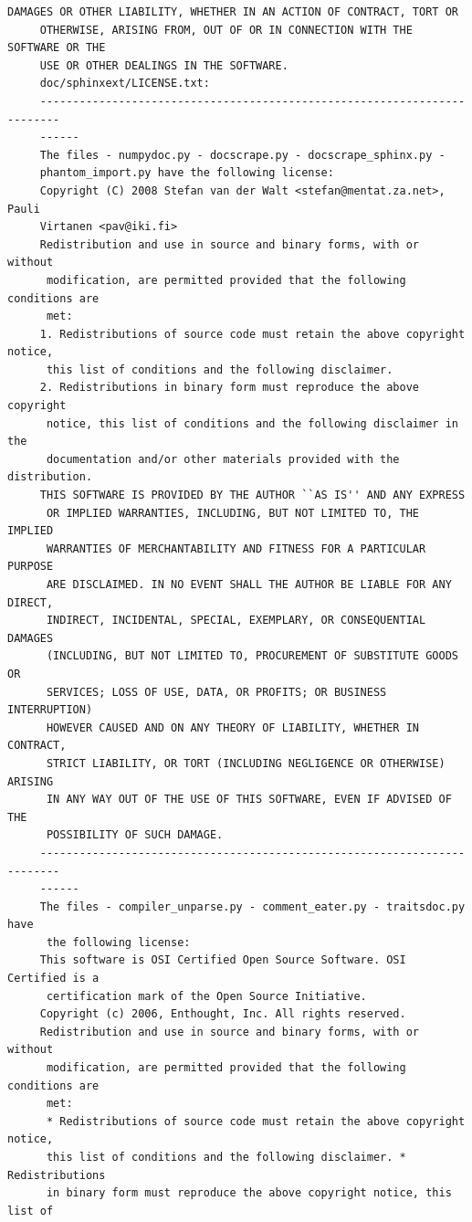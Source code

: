 \begin{lstlisting}[basicstyle=\ttfamily\footnotesize,breaklines=true]
     DAMAGES OR OTHER LIABILITY, WHETHER IN AN ACTION OF CONTRACT, TORT OR
     OTHERWISE, ARISING FROM, OUT OF OR IN CONNECTION WITH THE SOFTWARE OR THE
     USE OR OTHER DEALINGS IN THE SOFTWARE.
     doc/sphinxext/LICENSE.txt:
     -------------------------------------------------------------------------
     ------
     The files - numpydoc.py - docscrape.py - docscrape_sphinx.py -
     phantom_import.py have the following license:
     Copyright (C) 2008 Stefan van der Walt <stefan@mentat.za.net>, Pauli
     Virtanen <pav@iki.fi>
     Redistribution and use in source and binary forms, with or without
      modification, are permitted provided that the following conditions are
      met:
     1. Redistributions of source code must retain the above copyright notice,
      this list of conditions and the following disclaimer.
     2. Redistributions in binary form must reproduce the above copyright
      notice, this list of conditions and the following disclaimer in the
      documentation and/or other materials provided with the distribution.
     THIS SOFTWARE IS PROVIDED BY THE AUTHOR ``AS IS'' AND ANY EXPRESS
      OR IMPLIED WARRANTIES, INCLUDING, BUT NOT LIMITED TO, THE IMPLIED
      WARRANTIES OF MERCHANTABILITY AND FITNESS FOR A PARTICULAR PURPOSE
      ARE DISCLAIMED. IN NO EVENT SHALL THE AUTHOR BE LIABLE FOR ANY DIRECT,
      INDIRECT, INCIDENTAL, SPECIAL, EXEMPLARY, OR CONSEQUENTIAL DAMAGES
      (INCLUDING, BUT NOT LIMITED TO, PROCUREMENT OF SUBSTITUTE GOODS OR
      SERVICES; LOSS OF USE, DATA, OR PROFITS; OR BUSINESS INTERRUPTION)
      HOWEVER CAUSED AND ON ANY THEORY OF LIABILITY, WHETHER IN CONTRACT,
      STRICT LIABILITY, OR TORT (INCLUDING NEGLIGENCE OR OTHERWISE) ARISING
      IN ANY WAY OUT OF THE USE OF THIS SOFTWARE, EVEN IF ADVISED OF THE
      POSSIBILITY OF SUCH DAMAGE.
     -------------------------------------------------------------------------
     ------
     The files - compiler_unparse.py - comment_eater.py - traitsdoc.py have
      the following license:
     This software is OSI Certified Open Source Software. OSI Certified is a
      certification mark of the Open Source Initiative.
     Copyright (c) 2006, Enthought, Inc. All rights reserved.
     Redistribution and use in source and binary forms, with or without
      modification, are permitted provided that the following conditions are
      met:
      * Redistributions of source code must retain the above copyright notice,
      this list of conditions and the following disclaimer. * Redistributions
      in binary form must reproduce the above copyright notice, this list of

\end{lstlisting}
